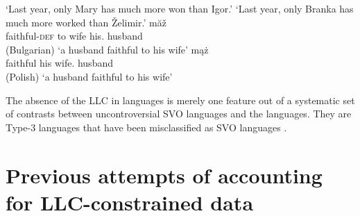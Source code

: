 \documentclass[output=paper
  ,nobabel
  ,uniformtopskip %
]{langscibook}
\begin{document}


\eal
\ex 
{}
\glt `Last year, only Mary has much more won than Igor.'
\ex 
{}
\glt `Last year, only Branka has much more worked than Želimir.'
\ex 
{} măž\\
     \spacebr{}faithful-\textsc{def}  \spacebr{}to wife his. husband\\\hfill(Bulgarian)
\glt `a husband faithful to his wife'
\ex 
{} mąż\\
     \spacebr{}faithful \spacebr{}his wife.\dat{} husband\\\hfill(Polish)
\glt `a husband faithful to his wife'
\zl

\noindent
The absence of the LLC in  languages is merely one feature out of a systematic set of contrasts between uncontroversial SVO languages and the  languages. They are Type-3 languages that have been misclassified as SVO languages \citep{HaiderSzucsich2022a,SzucsichHaider2015}.

\section{Previous attempts of accounting for LLC-constrained data}\label{sec-preattempts}
\end{document}
